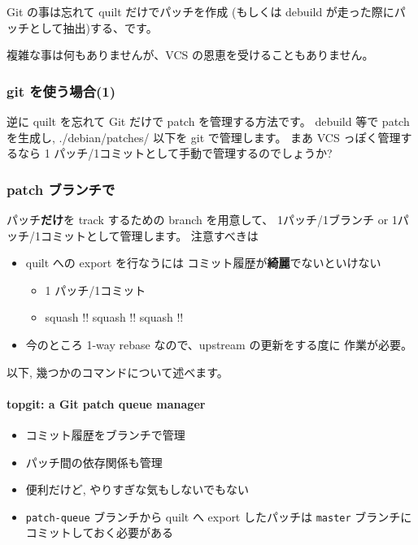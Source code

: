 \documentclass[mingoth,a4paper]{jsarticle}
\begin{document}
Git の事は忘れて quilt だけでパッチを作成
(もしくは debuild が走った際にパッチとして抽出)する、です。

複雑な事は何もありませんが、VCS の恩恵を受けることもありません。

\subsubsection*{git を使う場合(1)}
\label{sec-4-2}

逆に quilt を忘れて Git だけで patch を管理する方法です。
debuild 等で patch を生成し, {./debian/patches/} 以下を
git で管理します。
%
まあ VCS っぽく管理するなら
1 パッチ/1コミットとして手動で管理するのでしょうか?
%
\subsubsection*{patch ブランチで}
\label{sec-4-3}

パッチ\textbf{だけ}を track するための branch を用意して、
1パッチ/1ブランチ or 1パッチ/1コミットとして管理します。
注意すべきは
\begin{itemize}
\item quilt への export を行なうには
  コミット履歴が\textbf{綺麗}でないといけない
  \begin{itemize}
  \item 1 パッチ/1コミット
  \item squash !! squash !! squash !!
  \end{itemize}
\item 今のところ 1-way rebase なので、upstream の更新をする度に
  作業が必要。
\end{itemize}

以下, 幾つかのコマンドについて述べます。

\label{sec-4-5}
\paragraph{topgit: a Git patch queue manager}
\label{sec-4-5-1}

\begin{itemize}
\item コミット履歴をブランチで管理
\item パッチ間の依存関係も管理
\item 便利だけど, やりすぎな気もしないでもない
\item \texttt{patch-queue} ブランチから quilt へ export したパッチは
  \texttt{master} ブランチにコミットしておく必要がある
\end{itemize}
\end{document}
